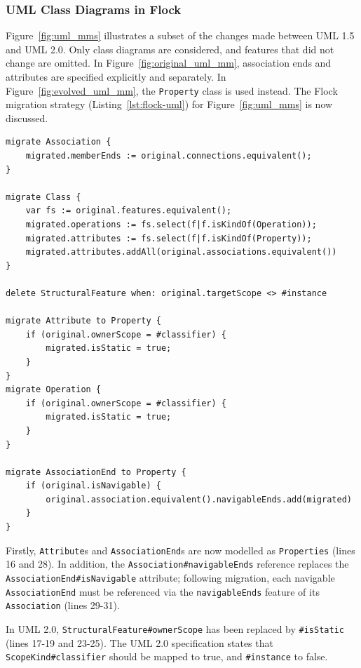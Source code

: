 \subsubsection{UML Class Diagrams in Flock}
Figure~\ref{fig:uml_mms} illustrates a subset of the changes made between UML 1.5 and UML 2.0. Only class diagrams are considered, and features that did not change are omitted. In Figure~\ref{fig:original_uml_mm}, association ends and attributes are specified explicitly and separately. In Figure~\ref{fig:evolved_uml_mm}, the \texttt{Pr\-op\-er\-ty} class is used instead. The Flock migration strategy (Listing~\ref{lst:flock-uml}) for Figure~\ref{fig:uml_mms} is now discussed.

\begin{lstlisting}[caption=UML model migration in Flock, label=lst:flock-uml, language=Flock]
migrate Association {
	migrated.memberEnds := original.connections.equivalent();
}

migrate Class {
	var fs := original.features.equivalent();
	migrated.operations := fs.select(f|f.isKindOf(Operation));
	migrated.attributes := fs.select(f|f.isKindOf(Property));
	migrated.attributes.addAll(original.associations.equivalent())
}

delete StructuralFeature when: original.targetScope <> #instance

migrate Attribute to Property {
	if (original.ownerScope = #classifier) {
		migrated.isStatic = true;		
	}
}
migrate Operation {
	if (original.ownerScope = #classifier) {
		migrated.isStatic = true;
	}
}

migrate AssociationEnd to Property {
	if (original.isNavigable) {
		original.association.equivalent().navigableEnds.add(migrated)
	}
}
\end{lstlisting}

Firstly, \texttt{At\-tr\-ib\-ut\-e}s and \texttt{As\-so\-ci\-at\-i\-onEn\-d}s are now modelled as \texttt{Pr\-o\-pe\-rt\-ies} (lines 16 and 28). In addition, the \texttt{As\-so\-ci\-at\-i\-on\#na\-vi\-ga\-b\-leEn\-ds} reference replaces the \texttt{As\-so\-ci\-at\-i\-onE\-nd\#isN\-av\-ig\-ab\-le} attribute; following migration, each navigable \texttt{As\-so\-ci\-at\-i\-onE\-nd} must be referenced via the \texttt{na\-vi\-ga\-bl\-eEn\-ds} feature of its \texttt{As\-so\-ci\-at\-ion} (lines 29-31).

In UML 2.0, \texttt{St\-ru\-ct\-ur\-alFe\-at\-ur\-e\#o\-wn\-er\-Sc\-op\-e} has been replaced by \texttt{\#i\-sS\-ta\-ti\-c} (lines 17-19 and 23-25). The UML 2.0 specification states that \texttt{Sc\-op\-eKi\-nd\#cl\-as\-si\-fi\-er} should be mapped to true, and \texttt{\#i\-ns\-ta\-nce} to false. 

